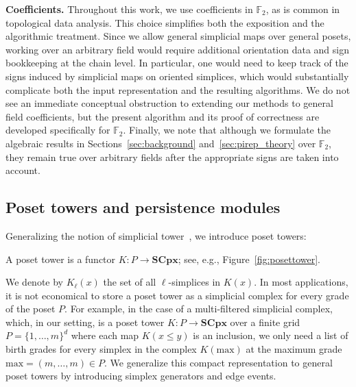 \documentclass[english,a4paper,nolineno,cleveref]{socg-lipics-v2021}
\begin{document}
\textbf{Coefficients.} Throughout this work, we use coefficients in $\mathbb{F}_2$, as is common in topological data analysis. This choice simplifies both the exposition and the algorithmic treatment. Since we allow general simplicial maps over general posets, working over an arbitrary field would require additional orientation data and sign bookkeeping at the chain level. In particular, one would need to keep track of the signs induced by simplicial maps on oriented simplices, which would substantially complicate both the input representation and the resulting algorithms. 
We do not see an immediate conceptual obstruction to extending our methods to general field coefficients, but the present algorithm and its proof of correctness are developed specifically for $\mathbb{F}_2$.
Finally, we note that although we formulate the algebraic results in Sections~\ref{sec:background} and~\ref{sec:pirep_theory} over $\mathbb{F}_2$, they remain true over arbitrary fields after the appropriate signs are taken into account.

\subsection{Poset towers and persistence modules}

Generalizing the notion of simplicial tower~\cite{dey2014computing,kerber2019barcodes}, we introduce poset towers: 

\begin{definition} \label{def:poset_tower}
A poset tower is a functor $K\colon P\rightarrow \mathbf{SCpx}$; see, e.g., Figure~\ref{fig:posettower}.
\end{definition}


We denote by $K_\ell(x)$ the set of all $\ell$-simplices in $K(x)$.
In most applications, it is not economical to store a poset tower as a simplicial complex for every grade of the poset $P$. For example, in the case of a multi-filtered simplicial complex, which, in our setting, is a poset tower $K\colon P\rightarrow \mathbf{SCpx}$ over a finite grid $P=\{1,\ldots,m\}^d$ where each map $K(x\leq y)$ is an inclusion, we only need a list of birth grades for every simplex in the complex $K(\text{max})$ at the maximum grade $\text{max}=(m,\ldots,m)\in P$. We generalize this compact representation to general poset towers by introducing simplex generators and edge events.
\end{document}
